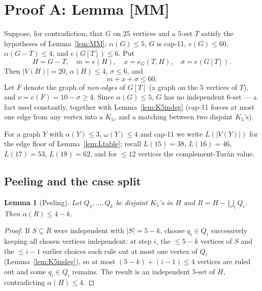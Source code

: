 \documentclass[11pt,reqno]{amsart}
\newtheorem{lemma}[theorem]{Lemma}
\theoremstyle{definition}
\theoremstyle{remark}
\newcommand{\abs}[1]{\left|#1\right|}
\newcommand{\capeleven}{\textsf{cap-11}}
\begin{document}
\section{Proof A: Lemma \textsf{[MM]}}\label{sec:MM}

Suppose, for contradiction, that $G$ on $25$ vertices and a $5$-set $T$ satisfy the
hypotheses of Lemma~\ref{lem:MM}: $\alpha(G)\le 5$, $G$ is \capeleven,
$e(G)\le 60$, $\alpha(G-T)\le 4$, and $e(G[T])\le 6$. Put
\[
  H=G-T,\quad m=e(H),\quad x=e_G(T,H),\quad \sigma=e(G[T]).
\]
Then $\abs{V(H)}=20$, $\alpha(H)\le 4$, $\sigma\le 6$, and
\begin{equation}\label{eq:MM-budget0}
  m+x+\sigma\le 60 .
\end{equation}
Let $F$ denote the graph of \emph{non-edges} of $G[T]$ (a graph on the $5$ vertices
of $T$), and $\nu=e(F)=10-\sigma\ge 4$. Since $\alpha(G)\le 5$, $G$ has no
independent $6$-set --- a fact used constantly, together with
Lemma~\ref{lem:K5indeg} (\capeleven{} forces at most one edge from any vertex into a
$K_5$, and a matching between two disjoint $K_5$'s).

For a graph $Y$ with $\alpha(Y)\le 3$, $\omega(Y)\le 4$ and \capeleven{} we write
$L(\abs{V(Y)})$ for the edge floor of Lemma~\ref{lem:Ltable}; recall
$L(15)=38$, $L(16)=46$, $L(17)=53$, $L(18)=62$, and for $\le 12$ vertices the
complement-Tur\'an value.

\subsection{Peeling and the case split}
\begin{lemma}[Peeling]\label{lem:peel}
Let $Q_1,\dots,Q_k$ be disjoint $K_5$'s in $H$ and $R=H-\bigcup_i Q_i$. Then
$\alpha(R)\le 4-k$.
\end{lemma}
\begin{proof}
If $S\subseteq R$ were independent with $\abs S=5-k$, choose $q_i\in Q_i$
successively keeping all chosen vertices independent: at step $i$, the $\le 5-k$
vertices of $S$ and the $\le i-1$ earlier choices each rule out at most one vertex
of $Q_i$ (Lemma~\ref{lem:K5indeg}), so at most $(5-k)+(i-1)\le 4$ vertices are
ruled out and some $q_i\in Q_i$ remains. The result is an independent $5$-set of
$H$, contradicting $\alpha(H)\le 4$.
\end{proof}
\end{document}
